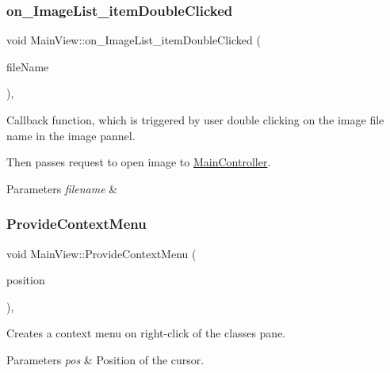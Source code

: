 \subsubsection{\texorpdfstring{on\+\_\+\+Image\+List\+\_\+item\+Double\+Clicked}{on\_ImageList\_itemDoubleClicked}}
{\footnotesize\ttfamily void Main\+View\+::on\+\_\+\+Image\+List\+\_\+item\+Double\+Clicked (\begin{DoxyParamCaption}\item[{Q\+List\+Widget\+Item $\ast$}]{file\+Name }\end{DoxyParamCaption})\hspace{0.3cm}{\ttfamily [private]}, {\ttfamily [slot]}}



Callback function, which is triggered by user double clicking on the image file name in the image pannel. 

Then passes request to open image to \hyperlink{classMainController}{Main\+Controller}.


\begin{DoxyParams}{Parameters}
{\em filename} & \\
\hline
\end{DoxyParams}
\mbox{\label{classMainView_aa9d5f1300bd6b2524f611873d68c938b}} 
\subsubsection{\texorpdfstring{Provide\+Context\+Menu}{ProvideContextMenu}}
{\footnotesize\ttfamily void Main\+View\+::\+Provide\+Context\+Menu (\begin{DoxyParamCaption}\item[{const Q\+Point \&}]{position }\end{DoxyParamCaption})\hspace{0.3cm}{\ttfamily [private]}, {\ttfamily [slot]}}



Creates a context menu on right-\/click of the classes pane. 


\begin{DoxyParams}{Parameters}
{\em pos} & Position of the cursor. \\
\hline
\end{DoxyParams}
\mbox{\label{classMainView_a077240bb5f37693cd4764914d69b98eb}} 
